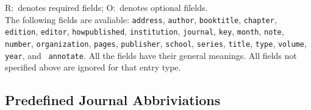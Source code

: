 \documentclass{article}
\begin{document}
\hfill\newline
\textsf{R:}~denotes required fields; \textsf{O:}~denotes optional filelds.\\[%
\baselineskip]
The following fields are avaliable: \texttt{address}, \texttt{author}, 
\texttt{booktitle}, \texttt{chapter}, \texttt{edition}, \texttt{editor}, 
\texttt{howpublished}, \texttt{institution}, \texttt{journal}, \texttt{key}, 
\texttt{month}, \texttt{note}, \texttt{number}, \texttt{organization}, 
\texttt{pages}, \texttt{publisher}, \texttt{school}, \texttt{series}, 
\texttt{title}, \texttt{type}, \texttt{volume}, \texttt{year}, and \texttt{%
annotate}. All the fields have their general meanings. All fields not
specified above are ignored for that entry type.

\subsection{Predefined Journal Abbriviations}
\end{document}
